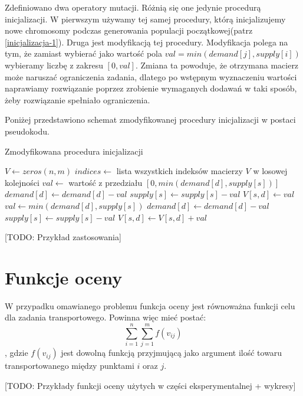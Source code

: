 Zdefiniowano dwa operatory mutacji. Różnią się one jedynie procedurą inicjalizacji. W pierwszym używamy tej samej procedury, którą inicjalizujemy 
nowe chromosomy podczas generowania populacji początkowej(patrz \ref{inicjalizacja-1}). Druga jest modyfikacją tej procedury. Modyfikacja polega na tym, że zamiast wybierać 
jako wartość pola $val = min(demand[j], supply[i])$ wybieramy liczbę z zakresu $[0, val]$. Zmiana ta powoduje, że otrzymana macierz może naruszać 
ograniczenia zadania, dlatego po wstępnym wyznaczeniu wartości naprawiamy rozwiązanie poprzez zrobienie wymaganych dodawań w taki sposób, żeby 
rozwiązanie spełniało ograniczenia. 

Poniżej przedstawiono schemat zmodyfikowanej procedury inicjalizacji w postaci pseudokodu.

\begin{pseudokod}[H]
    \label{inicjalizacja-2}
    \caption{Zmodyfikowana procedura inicjalizacji}
    \BlankLine
    $V \gets zeros(n, m)$
    $indices \gets$ lista wszystkich indeksów macierzy $V$ w losowej kolejności\;
    \BlankLine
     {
        $val \gets$ wartość z przedziału $[0, min(demand[d], supply[s])]$\;
        $demand[d] \gets demand[d] - val$\;
        $supply[s] \gets supply[s] - val$\;
        $V[s, d] \gets val$\;
    }
    \BlankLine
     {
        $val \gets min(demand[d], supply[s])$\;
        $demand[d] \gets demand[d] - val$\;
        $supply[s] \gets supply[s] - val$\;
        $V[s, d] \gets V[s, d] + val$\;
    }

\end{pseudokod}

[TODO: Przykład zastosowania]

\section{Funkcje oceny}
W przypadku omawianego problemu funkcja oceny jest równoważna funkcji celu dla zadania transportowego. Powinna więc mieć postać:
$$\sum_{i=1}^{n}\sum_{j=1}^{m} f(v_{ij})$$, 
gdzie $f(v_{ij})$ jest dowolną funkcją przyjmującą jako argument ilość towaru transportowanego między punktami $i$ oraz $j$.

[TODO: Przykłady funkcji oceny użytych w części eksperymentalnej + wykresy]

